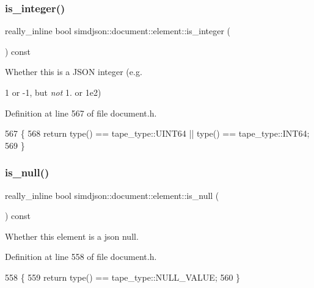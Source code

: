\subsubsection{\texorpdfstring{is\+\_\+integer()}{is\_integer()}}
{\footnotesize\ttfamily really\+\_\+inline bool simdjson\+::document\+::element\+::is\+\_\+integer (\begin{DoxyParamCaption}{ }\end{DoxyParamCaption}) const\hspace{0.3cm}{\ttfamily [noexcept]}}



Whether this is a J\+S\+ON integer (e.\+g. 

1 or -\/1, but {\itshape not} 1. or 1e2) 

Definition at line 567 of file document.\+h.


\begin{DoxyCode}
567                                                               \{
568   \textcolor{keywordflow}{return} type() == tape\_type::UINT64 || type() == tape\_type::INT64;
569 \}
\end{DoxyCode}
\mbox{\label{classsimdjson_1_1document_1_1element_a3ba0d5f3bc4427ff01d3a7f9af410188}} 
\subsubsection{\texorpdfstring{is\+\_\+null()}{is\_null()}}
{\footnotesize\ttfamily really\+\_\+inline bool simdjson\+::document\+::element\+::is\+\_\+null (\begin{DoxyParamCaption}{ }\end{DoxyParamCaption}) const\hspace{0.3cm}{\ttfamily [noexcept]}}



Whether this element is a json {\ttfamily null}. 



Definition at line 558 of file document.\+h.


\begin{DoxyCode}
558                                                            \{
559   \textcolor{keywordflow}{return} type() == tape\_type::NULL\_VALUE;
560 \}
\end{DoxyCode}
\mbox{\label{classsimdjson_1_1document_1_1element_a228b17e13e1a303052a8d6e758c84dde}} 
